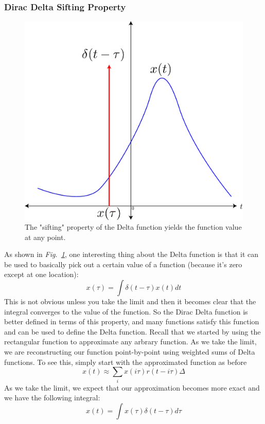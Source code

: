 \subsubsection{Dirac Delta Sifting Property}
\begin{figure}[tb]
\centering
\includegraphics[width=.5\columnwidth]{delta_sift}
\caption{The "sifting" property of the Delta function yields the function value at any point. }
\label{fig:delta_sift}
\end{figure}
As shown in \emph{Fig.~\ref{fig:delta_sift}}, one interesting thing about the Delta function is that it can be used to basically pick out a certain value of a function (because it's zero except at one location):
    \begin{equation}
        x\left(\tau\right)=\int\delta\left(t-\tau\right)x\left(t\right)dt
    \end{equation}
This is not obvious unless you take the limit and then it becomes clear that the integral converges to the value of the function.  So the Dirac Delta function is better defined in terms of this property, and many functions satisfy this function and can be used to define the Delta function.
Recall that we started by using the rectangular function to approximate any arbrary function.  As we take the limit, we are reconstructing our function point-by-point using weighted sums of Delta functions.  To see this, simply start with the approximated  function as before
    \begin{equation}
        x(t) \approx \sum_i x(i\tau) r(t - i\tau) \Delta
    \end{equation}
As we take the limit, we expect that our approximation becomes more exact and we have the following integral:
    \begin{equation}
        x\left(t\right)=\int x\left(\tau\right)\delta\left(t-\tau\right)d\tau
    \end{equation}
